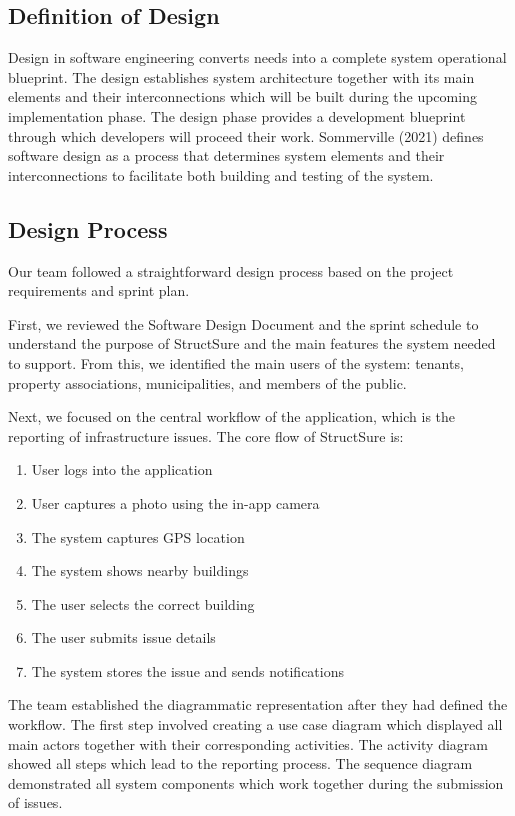 \documentclass[12pt]{article}
\begin{document}
\subsection{Definition of Design}

Design in software engineering converts needs into a complete system operational blueprint. The design establishes system architecture together with its main elements and their interconnections which will be built during the upcoming implementation phase. The design phase provides a development blueprint through which developers will proceed their work. Sommerville (2021) defines software design as a process that determines system elements and their interconnections to facilitate both building and testing of the system.

\subsection{Design Process}

Our team followed a straightforward design process based on the project requirements and sprint plan.

First, we reviewed the Software Design Document and the sprint schedule to understand the purpose of StructSure and the main features the system needed to support. From this, we identified the main users of the system: tenants, property associations, municipalities, and members of the public.

Next, we focused on the central workflow of the application, which is the reporting of infrastructure issues. The core flow of StructSure is:
\begin{enumerate}
    \item User logs into the application
    \item User captures a photo using the in-app camera
    \item The system captures GPS location
    \item The system shows nearby buildings
    \item The user selects the correct building
    \item The user submits issue details
    \item The system stores the issue and sends notifications
\end{enumerate}

The team established the diagrammatic representation after they had defined the workflow. The first step involved creating a use case diagram which displayed all main actors together with their corresponding activities. The activity diagram showed all steps which lead to the reporting process. The sequence diagram demonstrated all system components which work together during the submission of issues. 
\end{document}
